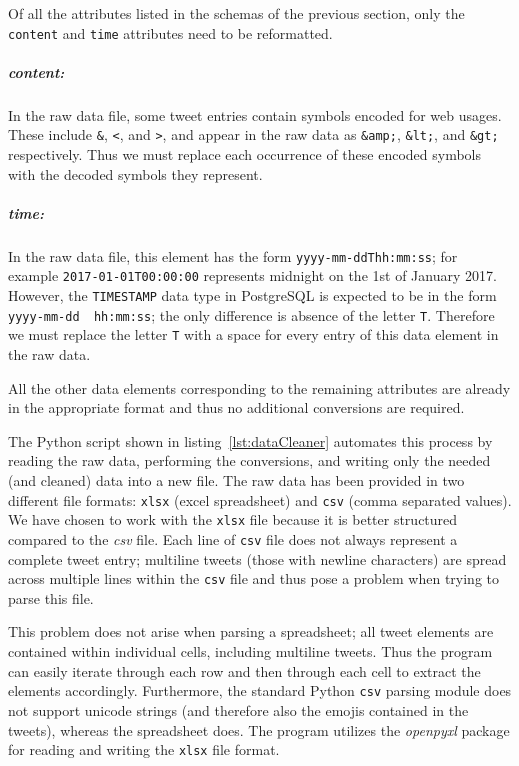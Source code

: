 \documentclass[a4paper, 12pt]{report}
\begin{document}
Of all the attributes listed in the schemas of the previous section, only the \texttt{content} and \texttt{time} attributes need to be reformatted.

\subparagraph{content:} In the raw data file, some tweet entries contain symbols encoded for web usages. These include \texttt{\&}, \texttt{<}, and \texttt{>}, and appear in the raw data as \texttt{\&amp;}, \texttt{\&lt;}, and \texttt{\&gt;} respectively. Thus we must replace each occurrence of these encoded symbols with the decoded symbols they represent.

\subparagraph{time:} In the raw data file, this element has the form \texttt{yyyy-mm-ddThh:mm:ss}; for example \texttt{2017-01-01T00:00:00} represents midnight on the 1st of January 2017. However, the \texttt{TIMESTAMP} data type in PostgreSQL is expected to be in the form \texttt{yyyy-mm-dd~ hh:mm:ss}; the only difference is absence of the letter \texttt{T}. Therefore we must replace the letter \texttt{T} with a space for every entry of this data element in the raw data.

All the other data elements corresponding to the remaining attributes are already in the appropriate format and thus no additional conversions are required.

The Python script shown in listing~\ref{lst:dataCleaner} automates this process by reading the raw data, performing the conversions, and writing only the needed (and cleaned) data into a new file. The raw data has been provided in two different file formats: \texttt{xlsx} (excel spreadsheet) and \texttt{csv} (comma separated values). We have chosen to work with the \texttt{xlsx} file because it is better structured compared to the \textit{csv} file. Each line of \texttt{csv} file does not always represent a complete tweet entry; multiline tweets (those with newline characters) are spread across multiple lines within the \texttt{csv} file and thus pose a problem when trying to parse this file.

This problem does not arise when parsing a spreadsheet; all tweet elements are contained within individual cells, including multiline tweets. Thus the program can easily iterate through each row and then through each cell to extract the elements accordingly. Furthermore, the standard Python \texttt{csv} parsing module does not support unicode strings (and therefore also the emojis contained in the tweets), whereas the spreadsheet does. The program utilizes the \textit{openpyxl} package for reading and writing the \texttt{xlsx} file format.
\end{document}
